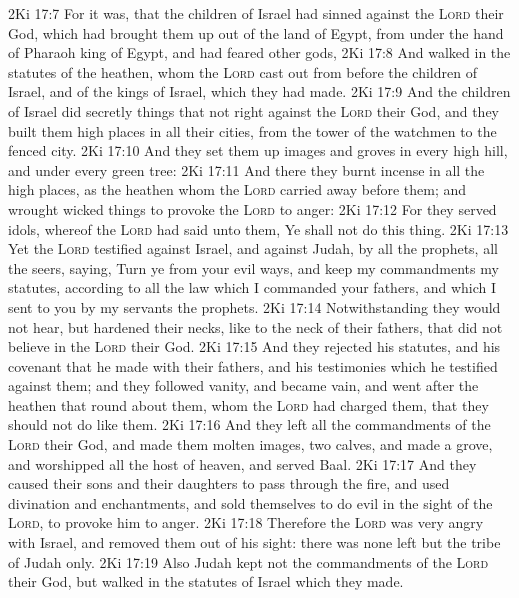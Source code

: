 \vs 2Ki 17:7 For  it was, that the children of Israel had sinned against the \textsc{Lord} their God, which had brought them up out of the land of Egypt, from under the hand of Pharaoh king of Egypt, and had feared other gods,
\vs 2Ki 17:8 And walked in the statutes of the heathen, whom the \textsc{Lord} cast out from before the children of Israel, and of the kings of Israel, which they had made.
\vs 2Ki 17:9 And the children of Israel did secretly  things that  not right against the \textsc{Lord} their God, and they built them high places in all their cities, from the tower of the watchmen to the fenced city.
\vs 2Ki 17:10 And they set them up images and groves in every high hill, and under every green tree:
\vs 2Ki 17:11 And there they burnt incense in all the high places, as  the heathen whom the \textsc{Lord} carried away before them; and wrought wicked things to provoke the \textsc{Lord} to anger:
\vs 2Ki 17:12 For they served idols, whereof the \textsc{Lord} had said unto them, Ye shall not do this thing.
\vs 2Ki 17:13 Yet the \textsc{Lord} testified against Israel, and against Judah, by all the prophets,  all the seers, saying, Turn ye from your evil ways, and keep my commandments  my statutes, according to all the law which I commanded your fathers, and which I sent to you by my servants the prophets.
\vs 2Ki 17:14 Notwithstanding they would not hear, but hardened their necks, like to the neck of their fathers, that did not believe in the \textsc{Lord} their God.
\vs 2Ki 17:15 And they rejected his statutes, and his covenant that he made with their fathers, and his testimonies which he testified against them; and they followed vanity, and became vain, and went after the heathen that  round about them,  whom the \textsc{Lord} had charged them, that they should not do like them.
\vs 2Ki 17:16 And they left all the commandments of the \textsc{Lord} their God, and made them molten images,  two calves, and made a grove, and worshipped all the host of heaven, and served Baal.
\vs 2Ki 17:17 And they caused their sons and their daughters to pass through the fire, and used divination and enchantments, and sold themselves to do evil in the sight of the \textsc{Lord}, to provoke him to anger.
\vs 2Ki 17:18 Therefore the \textsc{Lord} was very angry with Israel, and removed them out of his sight: there was none left but the tribe of Judah only.
\vs 2Ki 17:19 Also Judah kept not the commandments of the \textsc{Lord} their God, but walked in the statutes of Israel which they made.
